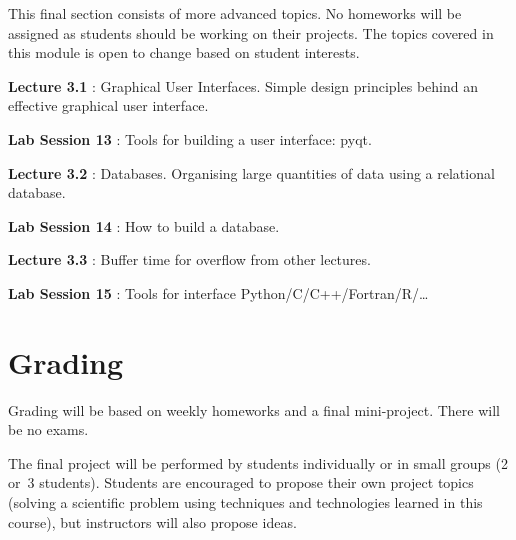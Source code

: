 \documentclass{article}
\newcommand*{\Lecture}[1]{%
{\bf #1}%
}
\begin{document}
This final section consists of more advanced topics. No homeworks will be assigned as students should be working on their projects. The topics covered in this module is open to change based on student interests.

\Lecture{Lecture 3.1}: Graphical User Interfaces. Simple design principles behind an effective graphical user interface.

\Lecture{Lab Session 13}: Tools for building a user interface: pyqt.

\Lecture{Lecture 3.2}: Databases. Organising large quantities of data using a relational database.

\Lecture{Lab Session 14}: How to build a database.

\Lecture{Lecture 3.3}: Buffer time for overflow from other lectures.

\Lecture{Lab Session 15}: Tools for interface Python/C/C++/Fortran/R/\dots

\section{Grading}

Grading will be based on weekly homeworks and a final mini-project. There will be no exams.

The final project will be performed by students individually or in small groups (2 or~3 students). Students are encouraged to propose their own project topics (solving a scientific problem using techniques and technologies learned in this course), but instructors will also propose ideas.
\end{document}
